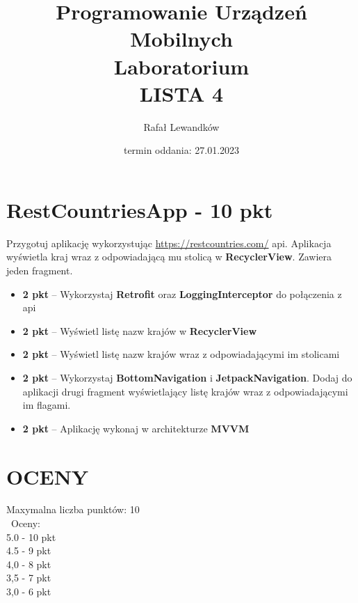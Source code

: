 \documentclass[a4paper]{article}
\title{Programowanie Urządzeń Mobilnych \\ Laboratorium \\ \textbf{LISTA 4}}
\author{Rafał Lewandków}
\date{termin oddania: 27.01.2023}
\begin{document}
\maketitle
    

\section*{RestCountriesApp - 10 pkt}

Przygotuj aplikację wykorzystując \url{https://restcountries.com/} api. Aplikacja wyświetla kraj wraz z odpowiadającą mu stolicą w \textbf{RecyclerView}. Zawiera jeden fragment.

\begin{itemize}
\item \textbf{2 pkt} -- Wykorzystaj \textbf{Retrofit} oraz \textbf{LoggingInterceptor} do połączenia z api

\item \textbf{2 pkt} -- Wyświetl listę nazw krajów w \textbf{RecyclerView}

\item \textbf{2 pkt} -- Wyświetl listę nazw krajów wraz z odpowiadającymi im stolicami

\item \textbf{2 pkt} -- Wykorzystaj \textbf{BottomNavigation} i \textbf{JetpackNavigation}. Dodaj do aplikacji drugi fragment wyświetlający listę krajów wraz z odpowiadającymi im flagami.

\item \textbf{2 pkt} -- Aplikację wykonaj w architekturze \textbf{MVVM}
\end{itemize}

\section*{OCENY}
Maxymalna liczba punktów: 10\\\
Oceny:\\
5.0 - 10 pkt\\
4.5 - 9 pkt\\
4,0 - 8 pkt\\
3,5 - 7 pkt\\
3,0 - 6 pkt
\end{document}
